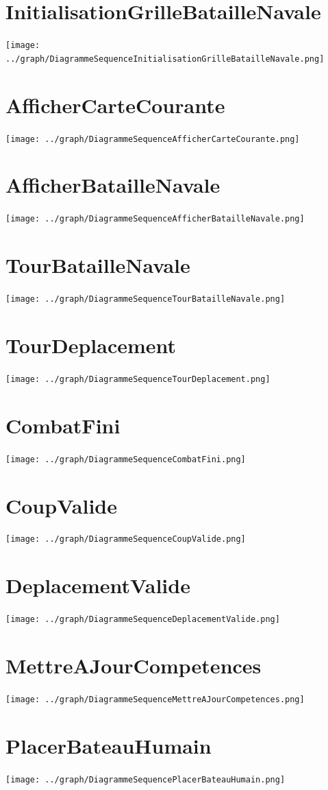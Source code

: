     \section{InitialisationGrilleBatailleNavale}
        \texttt{[image: ../graph/DiagrammeSequenceInitialisationGrilleBatailleNavale.png]}
    \section{AfficherCarteCourante}
        \texttt{[image: ../graph/DiagrammeSequenceAfficherCarteCourante.png]}
    \section{AfficherBatailleNavale}
        \texttt{[image: ../graph/DiagrammeSequenceAfficherBatailleNavale.png]}
    \section{TourBatailleNavale}
        \texttt{[image: ../graph/DiagrammeSequenceTourBatailleNavale.png]}
    \section{TourDeplacement}
        \texttt{[image: ../graph/DiagrammeSequenceTourDeplacement.png]}
    \section{CombatFini}
        \texttt{[image: ../graph/DiagrammeSequenceCombatFini.png]}
    \section{CoupValide}
        \texttt{[image: ../graph/DiagrammeSequenceCoupValide.png]}
    \section{DeplacementValide}
        \texttt{[image: ../graph/DiagrammeSequenceDeplacementValide.png]}
    \section{MettreAJourCompetences}
        \texttt{[image: ../graph/DiagrammeSequenceMettreAJourCompetences.png]}
    \section{PlacerBateauHumain}
        \texttt{[image: ../graph/DiagrammeSequencePlacerBateauHumain.png]}

